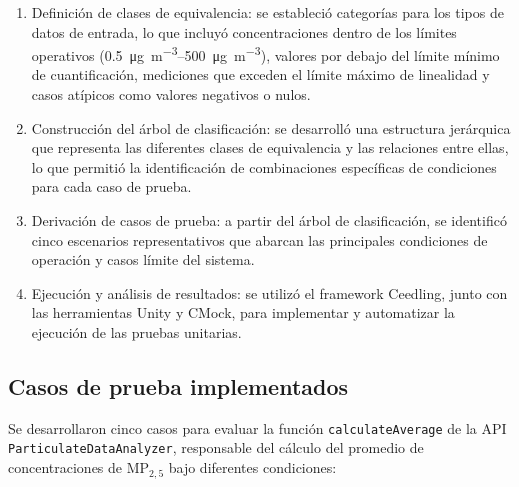 \begin{enumerate}
	\item Definición de clases de equivalencia: se estableció categorías para los tipos de datos de entrada, lo que incluyó concentraciones dentro de los límites operativos (\SIrange{0.5}{500}{\micro\gram\per\cubic\meter}), valores por debajo del límite mínimo de cuantificación, mediciones que exceden el límite máximo de linealidad y casos atípicos como valores negativos o nulos.
	
	\item Construcción del árbol de clasificación: se desarrolló una estructura jerárquica que representa las diferentes clases de equivalencia y las relaciones entre ellas, lo que permitió la identificación de combinaciones específicas de condiciones para cada caso de prueba.
	
	\item Derivación de casos de prueba: a partir del árbol de clasificación, se identificó cinco escenarios representativos que abarcan las principales condiciones de operación y casos límite del sistema.
	
	\item Ejecución y análisis de resultados: se utilizó el framework Ceedling, junto con las herramientas Unity y CMock, para implementar y automatizar la ejecución de las pruebas unitarias.
\end{enumerate}

\subsection{Casos de prueba implementados}

Se desarrollaron cinco casos  para evaluar la función \texttt{calculateAverage} de la API \texttt{ParticulateDataAnalyzer}, responsable del cálculo del promedio de concentraciones de MP$_{2,5}$ bajo diferentes condiciones:


